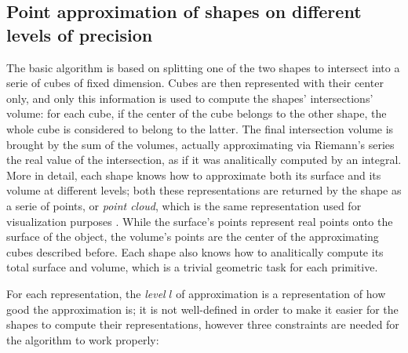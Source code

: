 \subsection{Point approximation of shapes on different levels of precision}
The basic algorithm is based on splitting one of the two shapes to intersect into a serie of cubes of
fixed dimension.
Cubes are then represented with their center only, and only this information is
used to compute the shapes' intersections' volume: for each cube, if the center
of the cube belongs to the other shape, the whole cube is considered to belong
to the latter. The final intersection volume is brought by the sum of the
volumes, actually approximating via Riemann's series the real value of the
intersection, as if it was
analitically computed by an integral. More in detail, each shape knows how to
approximate both its surface and its volume at different levels; both these
representations are returned by the shape as a serie of points, or \emph{point
cloud}, which is the same representation used for visualization purposes 
. While the surface's points represent real points onto the surface of the
object, the volume's points are the center of the approximating cubes described
before. Each shape also knows how to analitically compute its total surface and
volume, which is a trivial geometric task for each primitive.

For each representation, the \emph{level} $l$ of approximation is a representation
of how good the approximation is; it is not well-defined in order to make it
easier for the shapes to compute their representations, however three
constraints are needed for the algorithm to work properly:

